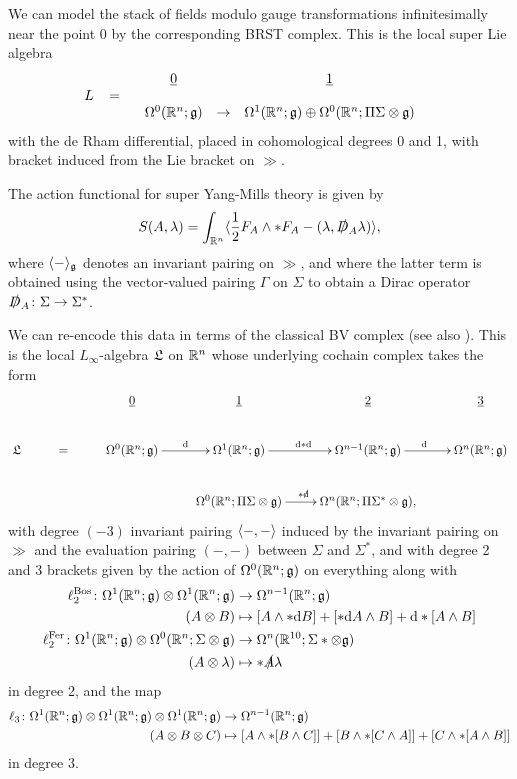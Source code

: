 \documentclass[10pt, oneside]{article}
\begin{document}
We can model the stack of fields modulo gauge transformations infinitesimally near the point $0$ by the corresponding BRST complex.  This is the local super Lie algebra
\[
L \;\;\; = \begin{array}{ccccc}
& \underline{0} & & \underline{1} & \\ 
& & & & \\
& \Omega^0(\mathbb R^{n}; \mathfrak{g}) & \to & \Omega^1(\mathbb R^{n}; \mathfrak{g}) \oplus \Omega^0(\mathbb R^{n}; \Pi \Sigma \otimes \mathfrak{g}) & 
\end{array}
\]
with the de Rham differential, placed in cohomological degrees 0 and 1, with bracket induced from the Lie bracket on $\gg$.

The action functional for super Yang-Mills theory is given by
\[S(A,\lambda) = \int_{\mathbb R^{n}} \langle \frac{1}{2} F_A \wedge \ast F_A - (\lambda, \slashed{D}_A \lambda)\rangle,\]
where $\langle - \rangle_\mathfrak g$ denotes an invariant pairing on $\gg$, and where the latter term is obtained using the vector-valued pairing $\Gamma$ on $\Sigma$ to obtain a Dirac operator $\slashed{D}_A \colon \Sigma \to \Sigma^*$. 

We can re-encode this data in terms of the classical BV complex (see also \cite[Section 3.1]{ElliottYoo1}).  
This is the local $L_\infty$-algebra $\mathfrak L$ on $\mathbb R^{n}$ whose underlying cochain complex takes the form
\[
\xymatrix{
& & \ul{0} & \ul{1} & \ul{2} & \ul{3} \\
\fL & = & \Omega^0(\RR^{n}; \gg) \ar[r]^{\d} &\Omega^1(\RR^{n}; \gg) \ar[r]^{\d \ast \d} &\Omega^{n-1}(\RR^{n}; \gg) \ar[r]^{\d} &\Omega^{n}(\RR^{n}; \gg) \\
& & &\Omega^0(\RR^{n}; \Pi \Sigma \otimes \gg) \ar[r]^{\ast \sd \d} &\Omega^{n}(\RR^{n}; \Pi \Sigma^* \otimes \gg), &
}\]
with degree $(-3)$ invariant pairing $\langle-,-\rangle$ induced by the invariant pairing on $\gg$ and the evaluation pairing $(-,-)$ between $\Sigma$ and $\Sigma^*$, and with degree 2 and 3 brackets given by the action of $\Omega^0(\mathbb R^{n}; \mathfrak{g})$ on everything along with
\begin{align*}
\ell_2^{\mathrm{Bos}} \colon \Omega^1(\mathbb R^{n};\mathfrak{g}) \otimes \Omega^1(\mathbb R^{n};\mathfrak{g}) &\to \Omega^{n-1}(\mathbb R^{n};\mathfrak{g}) \\
(A \otimes B) &\mapsto [A \wedge \ast \mathrm{d} B] + [\ast \mathrm{d}  A \wedge B] + \mathrm{d} \ast[A \wedge B] \\
\ell_2^{\mathrm{Fer}} \colon \Omega^1(\mathbb R^{n};\mathfrak{g}) \otimes \Omega^0(\mathbb R^{n}; \Sigma \otimes \mathfrak{g}) &\to \Omega^{n}(\mathbb R^{10}; \Sigma* \otimes \mathfrak{g}) \\
(A \otimes \lambda) &\mapsto \ast \slashed{A} \lambda
\end{align*}
in degree 2, and the map
\begin{align*}
\ell_3 \colon \Omega^1(\mathbb R^{n};\mathfrak{g}) \otimes \Omega^1(\mathbb R^{n};\mathfrak{g}) \otimes \Omega^1(\mathbb R^{n};\mathfrak{g}) &\to \Omega^{n-1}(\mathbb R^{n};\mathfrak{g}) \\
(A \otimes B \otimes C) &\mapsto [A \wedge \ast[B \wedge C]] + [B \wedge \ast[C \wedge A]] + [C \wedge \ast[A \wedge B]]
\end{align*}
in degree 3.
\end{document}

